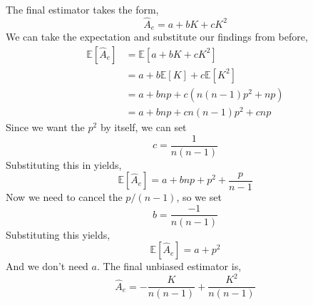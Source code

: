 \documentclass[12pt,twoside]{article}
\begin{document}
\begin{problems}
\begin{problemparts}
\problempart %

The final estimator takes the form,
$$ \hat{A}_e = a + bK + c K^2 $$
We can take the expectation and substitute our findings from before,
\begin{align*}
    \mathbb{E}[\hat{A}_e] &= \mathbb{E}[a + bK + cK^2] \\
    &= a + b \mathbb{E}[K] + c \mathbb{E}[K^2] \\
    &= a + b n p + c \left(n (n - 1) p^2 + np\right) \\
    &= a + b n p + c n (n - 1) p^2 + cnp
\end{align*}
Since we want the $p^2$ by itself, we can set
$$ c = \frac{1}{n(n - 1)} $$
Substituting this in yields,
$$ \mathbb{E}[\hat{A}_e] =  a + b n p + p^2 + \frac{p}{n - 1} $$
Now we need to cancel the $p / (n - 1)$, so we set
$$ b = \frac{-1}{n(n - 1)} $$
Substituting this yields,
$$ \mathbb{E}[\hat{A}_e] =  a + p^2 $$
And we don't need $a$. The final unbiased estimator is,
$$ \hat{A}_e = \boxed{-\frac{K}{n(n - 1)} + \frac{K^2}{n(n - 1)}} $$

\end{problemparts}

\end{problems}
\end{document}

